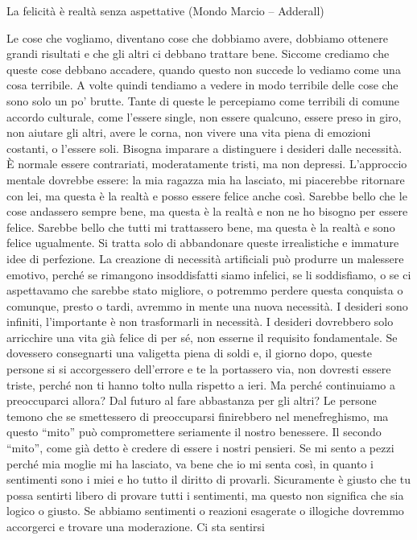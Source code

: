 \documentclass[12pt]{book} %
\begin{document}
La felicità è realtà senza aspettative (Mondo Marcio – Adderall)

Le cose che vogliamo, diventano cose che dobbiamo avere, dobbiamo ottenere grandi risultati e che gli altri ci debbano
trattare bene. Siccome crediamo che queste cose debbano accadere, quando questo non succede lo vediamo come una cosa
terribile. A volte quindi tendiamo a vedere in modo terribile delle cose che sono solo un po'
brutte. Tante di queste le percepiamo come terribili di comune accordo culturale, come l'essere
single, non essere qualcuno, essere preso in giro, non aiutare gli altri, avere le corna, non vivere una vita piena di
emozioni costanti, o l'essere soli. Bisogna imparare a distinguere i desideri dalle necessità. È
normale essere contrariati, moderatamente tristi, ma non depressi. L'approccio mentale dovrebbe
essere: la mia ragazza mia ha lasciato, mi piacerebbe ritornare con lei, ma questa è la realtà e posso essere felice
anche così. Sarebbe bello che le cose andassero sempre bene, ma questa è la realtà e non ne ho bisogno per essere
felice. Sarebbe bello che tutti mi trattassero bene, ma questa è la realtà e sono felice ugualmente. Si tratta solo di
abbandonare queste irrealistiche e immature idee di perfezione. La creazione di necessità artificiali può produrre un
malessere emotivo, perché se rimangono insoddisfatti siamo infelici, se li soddisfiamo, o se ci aspettavamo che sarebbe
stato migliore, o potremmo perdere questa conquista o comunque, presto o tardi, avremmo in mente una nuova necessità. I
desideri sono infiniti, l'importante è non trasformarli in necessità. I desideri dovrebbero solo
arricchire una vita già felice di per sé, non esserne il requisito fondamentale. Se
dovessero consegnarti una valigetta piena di soldi e, il giorno dopo, queste persone si si accorgessero dell'errore e
te la portassero via, non dovresti essere triste, perché non ti hanno tolto nulla rispetto a ieri. Ma perché
continuiamo a preoccuparci allora? Dal futuro al fare abbastanza per gli altri? Le persone temono che se smettessero di
preoccuparsi finirebbero nel menefreghismo, ma questo “mito” può compromettere seriamente il nostro benessere. Il
secondo “mito”, come già detto è credere di essere i nostri pensieri. Se mi sento a pezzi perché mia moglie mi ha
lasciato, va bene che io mi senta così, in quanto i sentimenti sono i miei e ho tutto il diritto di provarli. Sicuramente
è giusto che tu possa sentirti libero di provare tutti i sentimenti, ma questo non significa che sia logico o giusto.
Se abbiamo sentimenti o reazioni esagerate o illogiche dovremmo accorgerci e trovare una moderazione. Ci sta sentirsi
\end{document}
